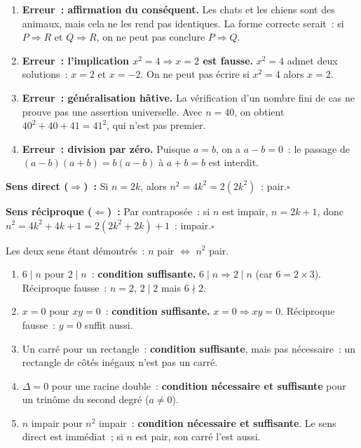 
\begin{enumerate}
  \item \textbf{Erreur~: affirmation du cons\'equent.}
        Les chats et les chiens sont des animaux, mais cela ne les rend pas identiques.
        La forme correcte serait~: si $P\Rightarrow R$ et $Q\Rightarrow R$, on ne peut pas
        conclure $P\Rightarrow Q$.
  \item \textbf{Erreur~: l'implication $x^2=4\Rightarrow x=2$ est fausse.}
        $x^2=4$ admet deux solutions~: $x=2$ et $x=-2$. On ne peut pas \'ecrire
        \og si $x^2=4$ alors $x=2$\fg.
  \item \textbf{Erreur~: g\'en\'eralisation h\^ative.}
        La v\'erification d'un nombre fini de cas ne prouve pas une assertion universelle.
        Avec $n=40$, on obtient $40^2+40+41=41^2$, qui n'est pas premier.
  \item \textbf{Erreur~: division par z\'ero.}
        Puisque $a=b$, on a $a-b=0$~: le passage de
        $(a-b)(a+b)=b(a-b)$ \`a $a+b=b$ est interdit.
\end{enumerate}


\textbf{Sens direct ($\Rightarrow$)~:} Si $n=2k$, alors $n^2=4k^2=2(2k^2)$~: pair.\hfill$\square$

\textbf{Sens r\'eciproque ($\Leftarrow$)~:} Par contrapos\'ee~: si $n$ est impair,
$n=2k+1$, donc $n^2=4k^2+4k+1=2(2k^2+2k)+1$~: impair.\hfill$\square$

Les deux sens \'etant d\'emontr\'es~: $n$ pair $\Leftrightarrow$ $n^2$ pair.


\begin{enumerate}
  \item $6\mid n$ pour $2\mid n$~: \textbf{condition suffisante.}
        $6\mid n\Rightarrow2\mid n$ (car $6=2\times3$).
        R\'eciproque fausse~: $n=2$, $2\mid2$ mais $6\nmid2$.
  \item $x=0$ pour $xy=0$~: \textbf{condition suffisante.}
        $x=0\Rightarrow xy=0$. R\'eciproque fausse~: $y=0$ suffit aussi.
  \item Un carr\'e pour un rectangle~: \textbf{condition suffisante},
        mais pas n\'ecessaire~: un rectangle de c\^ot\'es in\'egaux n'est pas un carr\'e.
  \item $\Delta=0$ pour une racine double~: \textbf{condition n\'ecessaire
        et suffisante} pour un trin\^ome du second degr\'e ($a\ne0$).
  \item $n$ impair pour $n^2$ impair~: \textbf{condition n\'ecessaire et suffisante}.
        Le sens direct est imm\'ediat~; si $n$ est pair, son carr\'e l'est aussi.
\end{enumerate}

